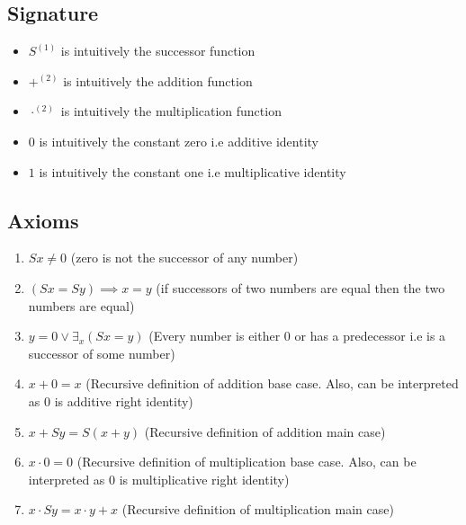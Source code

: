 \documentclass[
11pt,notheorems,hyperref={pdfauthor=whatever}
]{beamer}
\begin{document}
\subsection{Signature}
\begin{frame}
\begin{itemize}
    \setlength\itemsep{2em}
    \item $S^{(1)}$ is intuitively the successor function
    \item $+^{(2)}$ is intuitively the addition function
    \item $\cdot^{(2)}$ is intuitively the multiplication function
    \item $0$ is intuitively the constant zero i.e additive identity
    \item $1$ is intuitively the constant one i.e multiplicative identity
\end{itemize}
\end{frame}

\subsection{Axioms}
\begin{frame}
    \begin{enumerate}
        \setlength\itemsep{2em}
        \item $Sx \not= 0$ (zero is not the successor of any number)
        \item $(Sx = Sy) \implies x = y$ (if successors of two numbers are equal then the two numbers are equal)
        \item $y = 0 \vee \exists_x (Sx = y)$ (Every number is either 0 or has a predecessor i.e is a successor of some number)
        \item $x + 0 = x$ (Recursive definition of addition base case. Also, can be interpreted as $0$ is additive right identity)
        \item $x + Sy = S(x+y)$ (Recursive definition of addition main case)
        \item $x \cdot 0 = 0$ (Recursive definition of multiplication base case. Also, can be interpreted as $0$ is multiplicative right identity)
        \item $x \cdot Sy = x \cdot y + x$ (Recursive definition of multiplication main case)
    \end{enumerate}
\end{frame}
\end{document}
